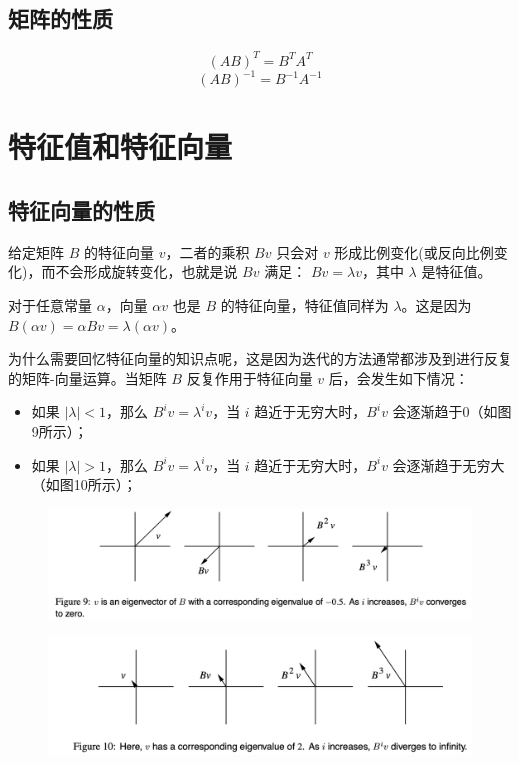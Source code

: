 \documentclass[12pt]{article}
\begin{document}
\subsection{矩阵的性质}
$$
(AB)^T = B^TA^T
$$
$$
(AB)^{-1} = B^{-1}A^{-1}
$$

\section{特征值和特征向量}
\subsection{特征向量的性质}
给定矩阵 $B$ 的特征向量 $v$，二者的乘积 $Bv$ 只会对 $v$ 形成比例变化(或反向比例变化)，而不会形成旋转变化，也就是说 $Bv$ 满足： $Bv = \lambda v$，其中 $\lambda$ 是特征值。

对于任意常量 $\alpha$，向量 $\alpha v$ 也是 $B$ 的特征向量，特征值同样为 $\lambda$。这是因为 $B(\alpha v) = \alpha Bv = \lambda (\alpha v)$。

为什么需要回忆特征向量的知识点呢，这是因为迭代的方法通常都涉及到进行反复的矩阵-向量运算。当矩阵 $B$ 反复作用于特征向量 $v$ 后，会发生如下情况：
\begin{itemize}
\setlength{\itemsep}{0pt}
\setlength{\parsep}{0pt}
\setlength{\parskip}{0pt}
    \item 如果 $|\lambda| < 1$，那么 $B^i v = \lambda^i v$，当 $i$ 趋近于无穷大时，$B^i v$ 会逐渐趋于0（如图9所示）；
    \item 如果 $|\lambda| > 1$，那么 $B^i v = \lambda^i v$，当 $i$ 趋近于无穷大时，$B^i v$ 会逐渐趋于无穷大（如图10所示）；
\end{itemize}
\begin{figure}[H]
    \centering
    \includegraphics[width=1\textwidth]{fig/CG_Plot_Eightvalue_1.png}
\end{figure}
\begin{figure}[H]
    \centering
    \includegraphics[width=1\textwidth]{fig/CG_Plot_Eightvalue_2.png}
\end{figure}
\end{document}

